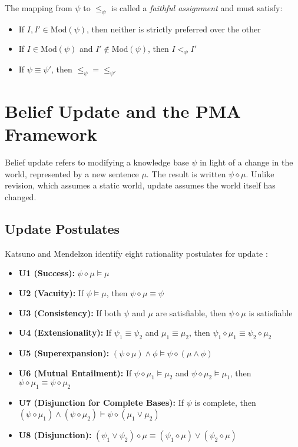 \documentclass[runningheads]{llncs}
\begin{document}
The mapping from \( \psi \) to \( \leq_\psi \) is called a \emph{faithful assignment} and must satisfy:
\begin{itemize}
    \item If \( I, I' \in \text{Mod}(\psi) \), then neither is strictly preferred over the other
    \item If \( I \in \text{Mod}(\psi) \) and \( I' \notin \text{Mod}(\psi) \), then \( I <_\psi I' \)
    \item If \( \psi \equiv \psi' \), then \( \leq_\psi = \leq_{\psi'} \)
\end{itemize}

\section{Belief Update and the PMA Framework}

Belief update refers to modifying a knowledge base \( \psi \) in light of a change in the world, represented by a new sentence \( \mu \). The result is written \( \psi \diamond \mu \). Unlike revision, which assumes a static world, update assumes the world itself has changed.

\subsection{Update Postulates}

Katsuno and Mendelzon identify eight rationality postulates for update \cite{katsuno}:

\begin{itemize}
    \item \textbf{U1 (Success):} \( \psi \diamond \mu \models \mu \)
    \item \textbf{U2 (Vacuity):} If \( \psi \models \mu \), then \( \psi \diamond \mu \equiv \psi \)
    \item \textbf{U3 (Consistency):} If both \( \psi \) and \( \mu \) are satisfiable, then \( \psi \diamond \mu \) is satisfiable
    \item \textbf{U4 (Extensionality):} If \( \psi_1 \equiv \psi_2 \) and \( \mu_1 \equiv \mu_2 \), then \( \psi_1 \diamond \mu_1 \equiv \psi_2 \diamond \mu_2 \)
    \item \textbf{U5 (Superexpansion):} \( (\psi \diamond \mu) \land \phi \models \psi \diamond (\mu \land \phi) \)
    \item \textbf{U6 (Mutual Entailment):} If \( \psi \diamond \mu_1 \models \mu_2 \) and \( \psi \diamond \mu_2 \models \mu_1 \), then \( \psi \diamond \mu_1 \equiv \psi \diamond \mu_2 \)
    \item \textbf{U7 (Disjunction for Complete Bases):} If \( \psi \) is complete, then \( (\psi \diamond \mu_1) \land (\psi \diamond \mu_2) \models \psi \diamond (\mu_1 \lor \mu_2) \)
    \item \textbf{U8 (Disjunction):} \( (\psi_1 \lor \psi_2) \diamond \mu \equiv (\psi_1 \diamond \mu) \lor (\psi_2 \diamond \mu) \)
\end{itemize}
\end{document}
